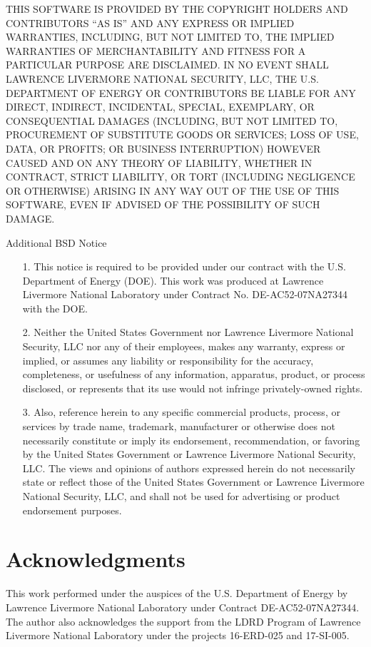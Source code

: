 \documentclass[11pt]{article}
\begin{document}
\begin{center}
{\begin{minipage}{0.9\textwidth}
\noindent THIS SOFTWARE IS PROVIDED BY THE COPYRIGHT HOLDERS AND CONTRIBUTORS ``AS IS'' AND ANY 
EXPRESS OR IMPLIED WARRANTIES, INCLUDING, BUT NOT LIMITED TO, THE IMPLIED WARRANTIES 
OF MERCHANTABILITY AND FITNESS FOR A PARTICULAR PURPOSE ARE DISCLAIMED. IN NO EVENT 
SHALL LAWRENCE LIVERMORE NATIONAL SECURITY, LLC, THE U.S. DEPARTMENT OF ENERGY OR 
CONTRIBUTORS BE LIABLE FOR ANY DIRECT, INDIRECT, INCIDENTAL, SPECIAL, EXEMPLARY, OR 
CONSEQUENTIAL DAMAGES (INCLUDING, BUT NOT LIMITED TO, PROCUREMENT OF SUBSTITUTE GOODS 
OR SERVICES; LOSS OF USE, DATA, OR PROFITS; OR BUSINESS INTERRUPTION) HOWEVER CAUSED 
AND ON ANY THEORY OF LIABILITY, WHETHER IN CONTRACT, STRICT LIABILITY, OR TORT 
(INCLUDING NEGLIGENCE OR OTHERWISE) ARISING IN ANY WAY OUT OF THE USE OF THIS SOFTWARE, 
EVEN IF ADVISED OF THE POSSIBILITY OF SUCH DAMAGE.

\medskip

Additional BSD Notice
\begin{itemize}
\item[1.] This notice is required to be provided under our contract with the U.S. Department 
of Energy (DOE). This work was produced at Lawrence Livermore National Laboratory under 
Contract No. DE-AC52-07NA27344 with the DOE.
\item[2.] Neither the United States Government nor Lawrence Livermore National Security, LLC 
nor any of their employees, makes any warranty, express or implied, or assumes any 
liability or responsibility for the accuracy, completeness, or usefulness of any 
information, apparatus, product, or process disclosed, or represents that its use would
not infringe privately-owned rights.
\item[3.] Also, reference herein to any specific commercial products, process, or services by 
trade name, trademark, manufacturer or otherwise does not necessarily constitute or 
imply its endorsement, recommendation, or favoring by the United States Government or 
Lawrence Livermore National Security, LLC. The views and opinions of authors expressed 
herein do not necessarily state or reflect those of the United States Government or 
Lawrence Livermore National Security, LLC, and shall not be used for advertising or 
product endorsement purposes.
\end{itemize}
\end{minipage}}\end{center}

\section{Acknowledgments}
This work performed under the auspices of the U.S. Department of Energy by Lawrence Livermore National Laboratory under Contract DE-AC52-07NA27344. The author also acknowledges the support from the LDRD Program of Lawrence Livermore National Laboratory under the projects 16-ERD-025 and 17-SI-005.
\end{document}
